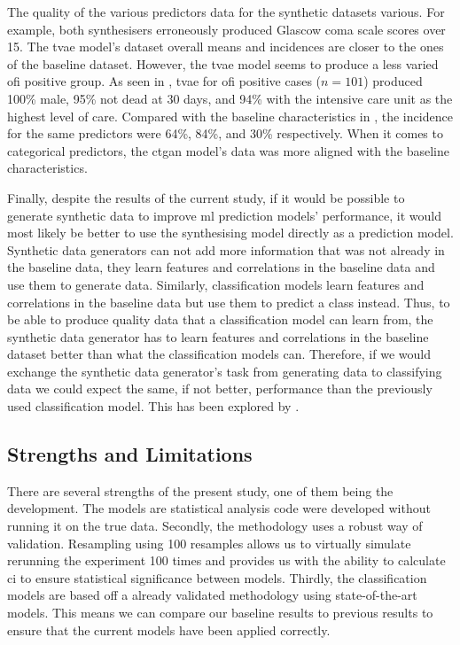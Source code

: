 \documentclass[12pt, a4paper]{article}
\begin{document}
The quality of the various predictors data for the synthetic datasets various. For example, both synthesisers erroneously produced Glascow coma scale scores over 15. The \acrshort{tvae} model's dataset overall means and incidences are closer to the ones of the baseline dataset. However, the \acrshort{tvae} model seems to produce a less varied \acrshort{ofi} positive group. As seen in , \acrshort{tvae} for \acrshort{ofi} positive cases ($n = 101$) produced 100\% male, 95\% not dead at 30 days, and 94\% with the intensive care unit as the highest level of care. Compared with the baseline characteristics in , the incidence for the same predictors were 64\%, 84\%, and 30\% respectively. When it comes to categorical predictors, the \acrshort{ctgan} model's data was more aligned with the baseline characteristics.

Finally, despite the results of the current study, if it would be possible to generate synthetic data to improve \acrshort{ml} prediction models' performance, it would most likely be better to use the synthesising model directly as a prediction model. Synthetic data generators can not add more information that was not already in the baseline data, they learn features and correlations in the baseline data and use them to generate data. Similarly, classification models learn features and correlations in the baseline data but use them to predict a class instead. Thus, to be able to produce quality data that a classification model can learn from, the synthetic data generator has to learn features and correlations in the baseline dataset better than what the classification models can. Therefore, if we would exchange the synthetic data generator's task from generating data to classifying data we could expect the same, if not better, performance than the previously used classification model. This has been explored by \cite{}.

\subsection{Strengths and Limitations}
There are several strengths of the present study, one of them being the development. The models are statistical analysis code were developed without running it on the true data. Secondly, the methodology uses a robust way of validation. Resampling using 100 resamples allows us to virtually simulate rerunning the experiment 100 times and provides us with the ability to calculate \acrshort{ci} to ensure statistical significance between models. Thirdly, the classification models are based off a already validated methodology using state-of-the-art models. This means we can compare our baseline results to previous results to ensure that the current models have been applied correctly.
\end{document}
